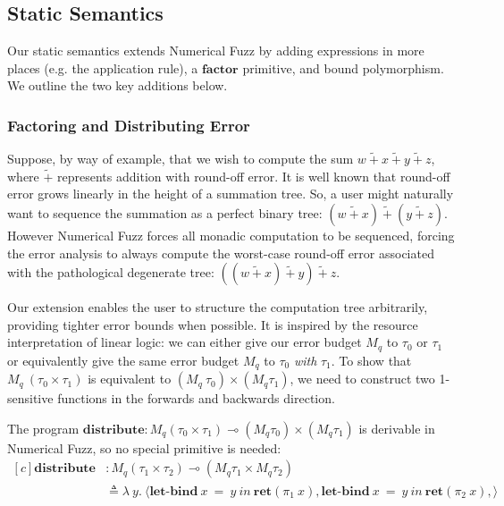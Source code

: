 

\subsection{Static Semantics}
Our static semantics extends Numerical Fuzz by adding expressions in more places
(e.g. the application rule), a $\textbf{factor}$ primitive, and bound
polymorphism. We outline the two key additions below.

\subsubsection*{Factoring and Distributing Error}
Suppose, by way of example, that we wish to compute the sum 
$w~\tilde{+}~x~\tilde{+}~y~\tilde{+}~z$, where $\tilde{+}$ represents addition
with round-off error.
It is well known that round-off error grows linearly in the height of a
summation tree. So, a user might naturally want to sequence the summation as
a perfect binary tree: $(w~\tilde{+}~x)~\tilde{+}~(y~\tilde{+}~z)$.
However Numerical Fuzz forces all monadic computation to be sequenced, forcing
the error analysis 
to always compute the worst-case round-off error associated with the
pathological degenerate tree: $((w~\tilde{+}~x)~\tilde{+}~y)~\tilde{+}~z$.

Our extension enables the user to structure the computation tree arbitrarily,
providing tighter error bounds when possible. It is inspired by the resource
interpretation of linear logic: we can either give our error budget $M_q$ to
$\tau_0$ or $\tau_1$ or equivalently give the same error budget $M_q$ to
$\tau_0$ \textit{with} $\tau_1$. To show that $M_q ~ (\tau_0 \times \tau_1)$
is equivalent to
$(M_q ~ \tau_0) \times (M_q \tau_1)$, we need to construct two 1-sensitive
functions in the forwards and backwards direction.

The program $\textbf{distribute} : M_q (\tau_0 \times \tau_1) \multimap (M_q \tau_0)
\times (M_q \tau_1)$ is derivable in Numerical Fuzz, so no special primitive is
needed:
\begin{equation*} \label{eq:distribute}
\begin{aligned}[c]
\textbf{distribute} &: M_q (\tau_1 \times \tau_2) \multimap (M_q \tau_1 \times M_q \tau_2) \\
 & \triangleq \lambda ~ y. ~ 
   \langle
     \textbf{let-bind} \ x ~ = ~ y \ in \ \textbf{ret}(\pi_1 ~ x),
     \textbf{let-bind} \ x ~ = ~ y \ in \ \textbf{ret}(\pi_2 ~ x),
   \rangle
\end{aligned}
\end{equation*}

